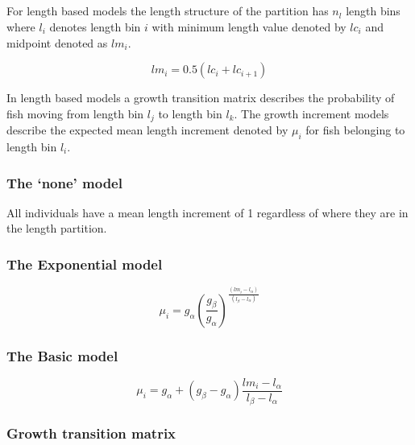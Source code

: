 \subsection{\label{sec:GrowthIncrement}}
For length based models the length structure of the partition has \(n_l\) length bins where \(l_i\) denotes length bin \(i\) with minimum length value denoted by \(lc_i\) and midpoint denoted as \(lm_i\).


\[
lm_i = 0.5 \left(lc_i + lc_{i+1}\right)
\]

In length based models a growth transition matrix describes the probability of fish moving from length bin \(l_j\) to length bin \(l_k\). The growth increment models describe the expected mean length increment denoted by \(\mu_i\) for fish belonging to length bin \(l_i\).



\subsubsection{The `none' model}\label{sec:GrowthIncrement-None}
All individuals have a mean length increment of 1 regardless of where they are in the length partition.

\subsubsection{The Exponential model}\label{sec:GrowthIncrement-Exponential}

\begin{equation}
\mu_i = g_\alpha \left(\frac{g_\beta}{g_\alpha} \right)^{\frac{(lm_i - l_\alpha)}{(l_\beta - l_\alpha)}}
\end{equation}

\subsubsection{The Basic model}\label{sec:GrowthIncrement-Basic}

\begin{equation}
\mu_i = g_\alpha + (g_\beta - g_\alpha) \frac{lm_i - l_\alpha}{l_\beta - l_\alpha}
\end{equation}

\subsubsection{Growth transition matrix}\label{sec:GrowthIncrement-GrowthMatrix}

